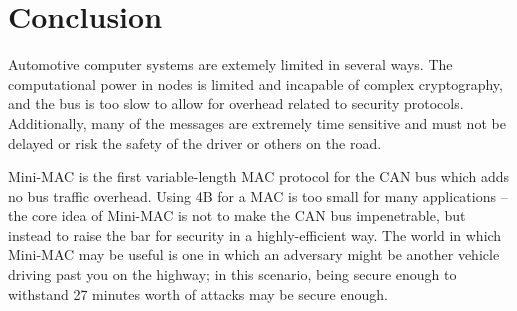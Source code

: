 \section{Conclusion}

Automotive computer systems are extemely limited in several ways. The computational power in nodes is limited and incapable of complex cryptography, and the bus is too slow to allow for overhead related to security protocols. Additionally, many of the messages are extremely time sensitive and must not be delayed or risk the safety of the driver or others on the road.

Mini-MAC is the first variable-length MAC protocol for the CAN bus which adds no bus traffic overhead. Using 4B for a MAC is too small for many applications -- the core idea of Mini-MAC is not to make the CAN bus impenetrable, but instead to raise the bar for security in a highly-efficient way. The world in which Mini-MAC may be useful is one in which an adversary might be another vehicle driving past you on the highway; in this scenario, being secure enough to withstand 27 minutes worth of attacks may be secure enough.